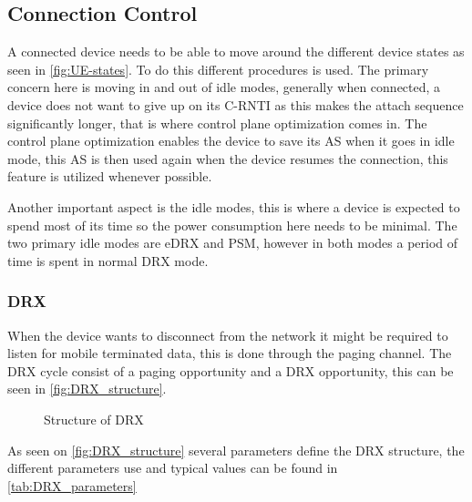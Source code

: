 \subsection{Connection Control}
A connected device needs to be able to move around the different device states as seen in \autoref{fig:UE-states}. To do this different procedures is used. The primary concern here is moving in and out of idle modes, generally when connected, a device does not want to give up on its \gls{C-RNTI} as this makes the attach sequence significantly longer, that is where control plane optimization comes in. The control plane optimization enables the device to save its \gls{AS} when it goes in idle mode, this \gls{AS} is then used again when the device resumes the connection, this feature is utilized whenever possible. 

Another important aspect is the idle modes, this is where a device is expected to spend most of its time so the power consumption here needs to be minimal. The two primary idle modes are \gls{eDRX} and \gls{PSM}, however in both modes a period of time is spent in normal DRX mode. 


\subsubsection{DRX}
When the device wants to disconnect from the network it might be required to listen for mobile terminated data, this is done through the paging channel. The DRX cycle consist of a paging opportunity and a DRX opportunity, this can be seen in \autoref{fig:DRX_structure}. 

\begin{figure}[H]
\centering
%
\caption{Structure of \gls{DRX}}
\label{fig:DRX_structure}
\end{figure}

As seen on \autoref{fig:DRX_structure} several parameters define the DRX structure, the different parameters use and typical values can be found in \autoref{tab:DRX_parameters}

